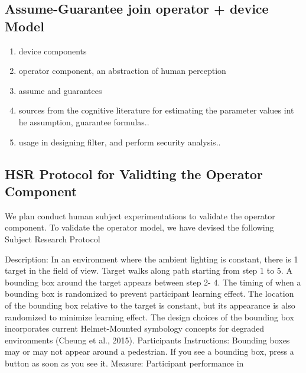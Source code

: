 \subsection{Assume-Guarantee join operator + device Model}


\begin{enumerate}

    \item device components 
    \item operator component, an abstraction of human perception 
    \item assume and guarantees 
    \item sources from the cognitive literature for estimating the parameter values int he assumption, guarantee formulas.. 
    \item usage in designing filter, and perform security analysis.. 
    
\end{enumerate}

\subsection{HSR Protocol for Validting the Operator Component}

We plan conduct human subject experimentations to validate the operator component.  
To validate the operator model, we have devised the following Subject Research Protocol

Description: In an environment where the ambient lighting is constant, there is 1 target in the field of view.
Target walks along path starting from step 1 to 5. A bounding box around the target appears between step 2-
4. The timing of when a bounding box is randomized to prevent participant learning effect. The location of
the bounding box relative to the target is constant, but its appearance is also randomized to minimize
learning effect. The design choices of the bounding box incorporates current Helmet-Mounted symbology
concepts for degraded environments (Cheung et al., 2015).
Participants Instructions: Bounding boxes may or may not appear around a pedestrian. If you see a
bounding box, press a button as soon as you see it.
Measure: Participant performance in 

